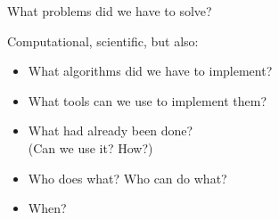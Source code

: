 \begin{frame}{What problems did we have to solve?}

Computational, scientific, but also:

\begin{itemize}
\item What algorithms did we have to implement?
\item What tools can we use to implement them?
\item What had already been done? \\
(Can we use it? How?)
\item Who does what? Who can do what?
\item When?
\end{itemize}

\end{frame}